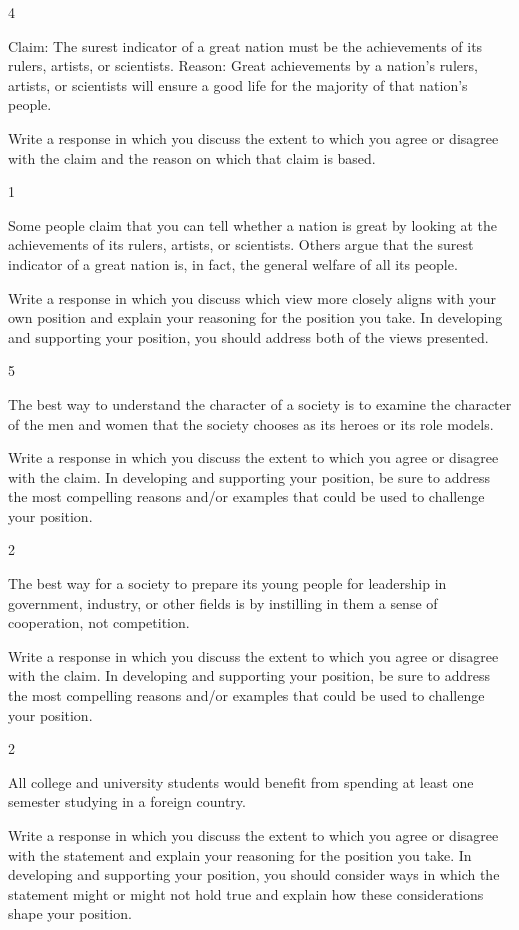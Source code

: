 \documentclass[]{article}
\begin{document}
4

Claim: The surest indicator of a great nation must be the achievements
of its rulers, artists, or scientists. Reason: Great achievements by a
nation's rulers, artists, or scientists will ensure a good life for the
majority of that nation's people.

Write a response in which you discuss the extent to which you agree or
disagree with the claim and the reason on which that claim is based.

1

Some people claim that you can tell whether a nation is great by looking
at the achievements of its rulers, artists, or scientists. Others argue
that the surest indicator of a great nation is, in fact, the general
welfare of all its people.

Write a response in which you discuss which view more closely aligns
with your own position and explain your reasoning for the position you
take. In developing and supporting your position, you should address
both of the views presented.

5

The best way to understand the character of a society is to examine the
character of the men and women that the society chooses as its heroes or
its role models.

Write a response in which you discuss the extent to which you agree or
disagree with the claim. In developing and supporting your position, be
sure to address the most compelling reasons and/or examples that could
be used to challenge your position.

2

The best way for a society to prepare its young people for leadership in
government, industry, or other fields is by instilling in them a sense
of cooperation, not competition.

Write a response in which you discuss the extent to which you agree or
disagree with the claim. In developing and supporting your position, be
sure to address the most compelling reasons and/or examples that could
be used to challenge your position.

2

All college and university students would benefit from spending at least
one semester studying in a foreign country.

Write a response in which you discuss the extent to which you agree or
disagree with the statement and explain your reasoning for the position
you take. In developing and supporting your position, you should
consider ways in which the statement might or might not hold true and
explain how these considerations shape your position.
\end{document}
